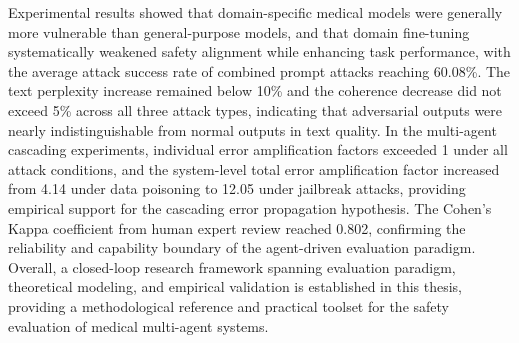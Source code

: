 {Experimental results showed that domain-specific medical models were generally more vulnerable than general-purpose models, and that domain fine-tuning systematically weakened safety alignment while enhancing task performance, with the average attack success rate of combined prompt attacks reaching 60.08\%. The text perplexity increase remained below 10\% and the coherence decrease did not exceed 5\% across all three attack types, indicating that adversarial outputs were nearly indistinguishable from normal outputs in text quality. In the multi-agent cascading experiments, individual error amplification factors exceeded 1 under all attack conditions, and the system-level total error amplification factor increased from 4.14 under data poisoning to 12.05 under jailbreak attacks, providing empirical support for the cascading error propagation hypothesis. The Cohen's Kappa coefficient from human expert review reached 0.802, confirming the reliability and capability boundary of the agent-driven evaluation paradigm. Overall, a closed-loop research framework spanning evaluation paradigm, theoretical modeling, and empirical validation is established in this thesis, providing a methodological reference and practical toolset for the safety evaluation of medical multi-agent systems.
}


